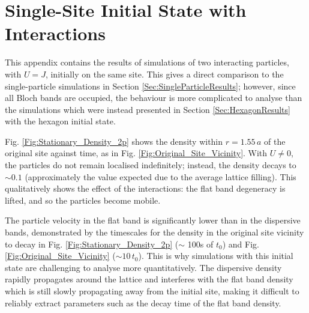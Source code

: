 \chapter{Single-Site Initial State with Interactions}\label{App:SingleSite_2p}

This appendix contains the results of simulations of two interacting particles, with $U=J$, initially on the same site. This gives a direct comparison to the single-particle simulations in Section \ref{Sec:SingleParticleResults}; however, since all Bloch bands are occupied, the behaviour is more complicated to analyse than the simulations which were instead presented in Section \ref{Sec:HexagonResults} with the hexagon initial state. 

Fig. \ref{Fig:Stationary_Density_2p} shows the density within $r=1.55\,a$ of the original site against time, as in Fig. \ref{Fig:Original_Site_Vicinity}. With $U\neq 0$, the particles do not remain localised indefinitely; instead, the density decays to $\sim0.1$ (approximately the value expected due to the average lattice filling). This qualitatively shows the effect of the interactions: the flat band degeneracy is lifted, and so the particles become mobile. 

The particle velocity in the flat band is significantly lower than in the dispersive bands, demonstrated by the timescales for the density in the original site vicinity to decay in Fig. \ref{Fig:Stationary_Density_2p} ($\sim$ 100s of $t_0$) and Fig. \ref{Fig:Original_Site_Vicinity} ($\sim 10\,t_0$). This is why simulations with this initial state are challenging to analyse more quantitatively. The dispersive density rapidly propagates around the lattice and interferes with the flat band density which is still slowly propagating away from the initial site, making it difficult to reliably extract parameters such as the decay time of the flat band density.

